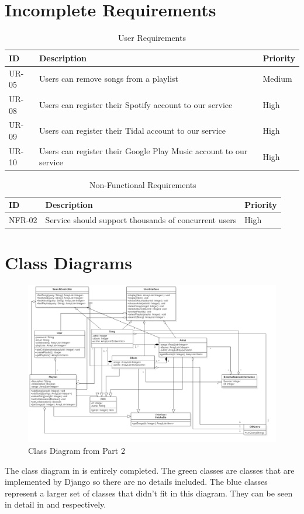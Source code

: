 \documentclass[12pt]{article}
\begin{document}
\section{Incomplete Requirements}
\begin{table}[H]
	\centering
	\label{tab:uri}
	\caption*{User Requirements}
	\begin{tabularx}{450pt}{lXl}
		ID & Description & Priority\\\hline
		UR-05 & Users can remove songs from a playlist & Medium \\
		UR-08 & Users can register their Spotify account to our service & High \\
		UR-09 & Users can register their Tidal account to our service & High \\
		UR-10 & Users can register their Google Play Music account to our service & High \\
	\end{tabularx}
\end{table}
\begin{table}[H]
	\centering
	\label{tab:nfri}
	\caption*{Non-Functional Requirements}
	\begin{tabularx}{450pt}{lXl}
		ID & Description & Priority\\\hline
		NFR-02 & Service should support thousands of concurrent users & High \\
	\end{tabularx}
\end{table}
\section{Class Diagrams}
\begin{figure}[H]
	\centering
	\includegraphics[scale=0.35]{MusicManagerClassDiagram.png}
	\caption{Class Diagram from Part 2}
	\label{fig:classDiagPart2}
\end{figure}
The class diagram in  is entirely completed. The green classes are classes that are implemented by Django so there are no details included. The blue classes represent a larger set of classes that didn't fit in this diagram. They can be seen in detail in  and  respectively. 
\end{document}
